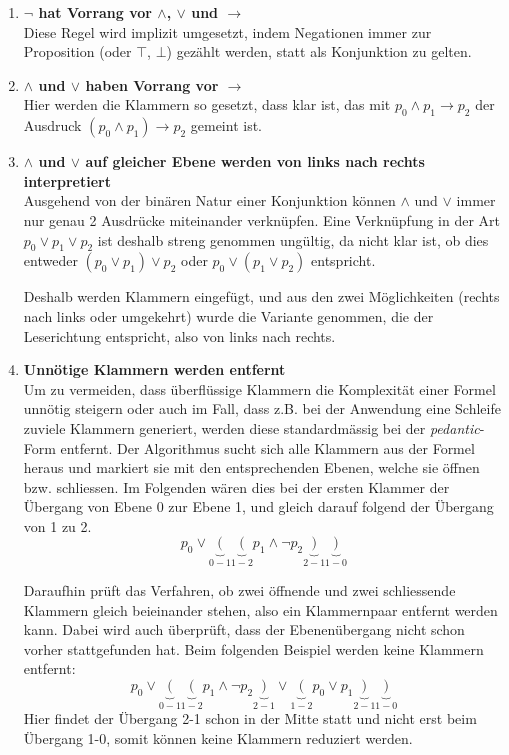 \documentclass[11pt,a4paper,ngerman]{scrreprt}
\begin{document}
\begin{enumerate}
 \item \textbf{$\neg$ hat Vorrang vor $\wedge$, $\vee$ und $\rightarrow$} \\
 Diese Regel wird implizit umgesetzt, indem Negationen immer zur Proposition (oder $\top$, $\bot$) gezählt werden, statt als Konjunktion zu gelten.
 
 \item \textbf{$\wedge$ und $\vee$ haben Vorrang vor $\rightarrow$} \\
 Hier werden die Klammern so gesetzt, dass klar ist, das mit $p_0 \wedge p_1 \rightarrow p_2$ der Ausdruck $(p_0 \wedge p_1) \rightarrow p_2$ gemeint ist.
 
 \item \textbf{$\wedge$ und $\vee$ auf gleicher Ebene werden von links nach rechts interpretiert} \\ 
 Ausgehend von der binären Natur einer Konjunktion können $\wedge$ und $\vee$ immer nur genau 2 Ausdrücke miteinander verknüpfen. Eine Verknüpfung in der Art $p_0 \vee p_1 \vee p_2$ ist deshalb streng genommen ungültig, da nicht klar ist, ob dies entweder $(p_0 \vee p_1) \vee p_2$ oder $p_0 \vee (p_1 \vee p_2)$ entspricht.
 
 Deshalb werden Klammern eingefügt, und aus den zwei Möglichkeiten (rechts nach links oder umgekehrt) wurde die Variante genommen, die der Leserichtung entspricht, also von links nach rechts.
 
 \item \textbf{Unnötige Klammern werden entfernt} \\
 Um zu vermeiden, dass überflüssige Klammern die Komplexität einer Formel unnötig steigern oder auch im Fall, dass z.B. bei der Anwendung eine Schleife zuviele Klammern generiert, werden diese standardmässig bei der \textit{pedantic}-Form entfernt. Der Algorithmus sucht sich alle Klammern aus der Formel heraus und markiert sie mit den entsprechenden Ebenen, welche sie öffnen bzw. schliessen. Im Folgenden wären dies bei der ersten Klammer der Übergang von Ebene 0 zur Ebene 1, und gleich darauf folgend der Übergang von 1 zu 2.
\begin{equation}
p_0 \vee \underbrace{(}_{0-1} \underbrace{(}_{1-2} p_1 \wedge \neg p_2 \underbrace{)}_{2-1} \underbrace{)}_{1-0}
\end{equation}

Daraufhin prüft das Verfahren, ob zwei öffnende und zwei schliessende Klammern gleich beieinander stehen, also ein Klammernpaar entfernt werden kann. Dabei wird auch überprüft, dass der Ebenenübergang nicht schon vorher stattgefunden hat. Beim folgenden Beispiel werden keine Klammern entfernt:
\begin{equation}
p_0 \vee \underbrace{(}_{0-1} \underbrace{(}_{1-2} p_1 \wedge \neg p_2\underbrace{)}_{2-1} \vee \underbrace{(}_{1-2} p_0 \vee p_1 \underbrace{)}_{2-1} \underbrace{)}_{1-0}
\end{equation}
Hier findet der Übergang 2-1 schon in der Mitte statt und nicht erst beim Übergang 1-0, somit können keine Klammern reduziert werden.
 
\end{enumerate}
\end{document}
